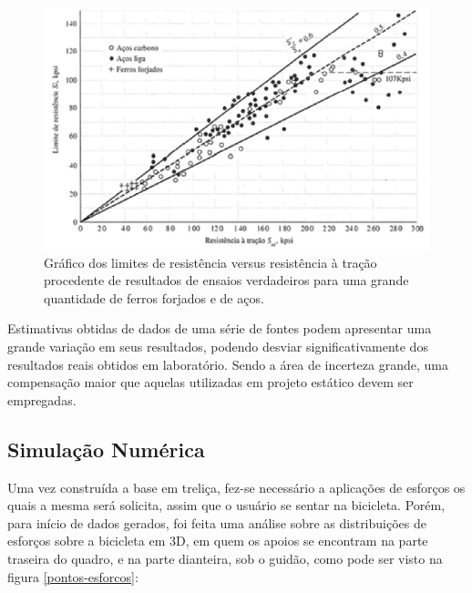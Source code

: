 \begin{figure}[h]
\centering
\includegraphics[scale=0.6]{figuras/resistencia_tracao.png}
\caption{Gráfico dos limites de resistência versus resistência à tração procedente de resultados de ensaios verdadeiros para uma grande quantidade de ferros forjados e de aços.}
\label{grafico-limites}
\end{figure}

Estimativas obtidas de dados de uma série de fontes podem apresentar uma grande variação em seus resultados, podendo desviar significativamente dos resultados reais obtidos em laboratório. Sendo a área de incerteza grande, uma compensação maior que aquelas utilizadas em projeto estático devem ser empregadas.

\subsection{Simulação Numérica}

Uma vez construída a base em treliça, fez-se necessário a aplicações de esforços os quais a mesma será solicita, assim que o usuário se sentar na bicicleta. Porém, para início de dados gerados, foi feita uma análise sobre as distribuições de esforços sobre a bicicleta em 3D, em quem os apoios se encontram na parte traseira do quadro, e na parte dianteira, sob o guidão, como pode ser visto na figura \ref{pontos-esforcos}:

